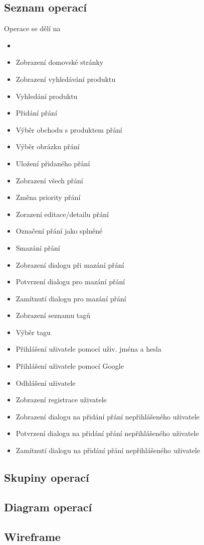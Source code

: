 \subsection{Seznam operací}
Operace se dělí na 
\begin{multicols}{2}
\begin{itemize}
\item {}
\item Zobrazení domovské stránky
\item Zobrazení vyhledávání produktu
\item Vyhledání produktu
\item Přidání přání
\item Výběr obchodu s produktem přání
\item Výběr obrázku přání
\item Uložení přidaného přání
\item Zobrazení všech přání
\item Změna priority přání
\item Zorazení editace/detailu přání
\item Označení přání jako splněné
\item Smazání přání
\item Zobrazení dialogu při mazání přání
\item Potvrzení dialogu pro mazání přání
\item Zamítnutí dialogu pro mazání přání
\item Zobrazení seznamu tagů
\item Výběr tagu
\item Přihlášení uživatele pomocí uživ. jména a hesla
\item Přihlášení uživatele pomocí Google
\item Odhlášení uživatele
\item Zobrazení registrace uživatele
\item Zobrazení dialogu na přidání přání nepřihlášeného uživatele
\item Potvrzení dialogu na přidání přání nepřihlášeného uživatele
\item Zamítnutí dialogu na přidání přání nepřihlášeného uživatele
\end{itemize}
\end{multicols}

\subsection{Skupiny operací}

\subsection{Diagram operací}

\subsection{Wireframe}